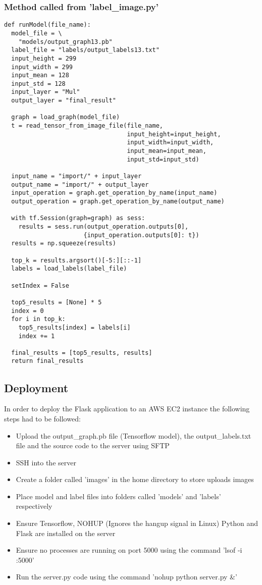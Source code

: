 \subsubsection*{Method called from 'label\_image.py'}
\begin{lstlisting}[style=Python]
def runModel(file_name):
  model_file = \
    "models/output_graph13.pb"
  label_file = "labels/output_labels13.txt"
  input_height = 299
  input_width = 299
  input_mean = 128
  input_std = 128
  input_layer = "Mul"
  output_layer = "final_result"

  graph = load_graph(model_file)
  t = read_tensor_from_image_file(file_name,
                                  input_height=input_height,
                                  input_width=input_width,
                                  input_mean=input_mean,
                                  input_std=input_std)

  input_name = "import/" + input_layer
  output_name = "import/" + output_layer
  input_operation = graph.get_operation_by_name(input_name)
  output_operation = graph.get_operation_by_name(output_name)

  with tf.Session(graph=graph) as sess:
    results = sess.run(output_operation.outputs[0],
                      {input_operation.outputs[0]: t})
  results = np.squeeze(results)

  top_k = results.argsort()[-5:][::-1]
  labels = load_labels(label_file)

  setIndex = False

  top5_results = [None] * 5
  index = 0
  for i in top_k:
    top5_results[index] = labels[i]
    index += 1

  final_results = [top5_results, results]
  return final_results
\end{lstlisting}

\subsection*{Deployment}
In order to deploy the Flask application to an AWS EC2 instance the following steps had to be followed:

\begin{itemize}
    \item{Upload the output\_graph.pb file (Tensorflow model), the output\_labels.txt file and the source code to the server using SFTP}
    \item{SSH into the server}
    \item{Create a folder called 'images' in the home directory to store uploads images}
    \item{Place model and label files into folders called 'models' and 'labels' respectively}
    \item{Ensure Tensorflow, NOHUP (Ignores the hangup signal in Linux) Python and Flask are installed on the server}
    \item{Ensure no processes are running on port 5000 using the command 'lsof -i :5000'}
    \item{Run the server.py code using the command 'nohup python server.py \&'}
\end{itemize}


